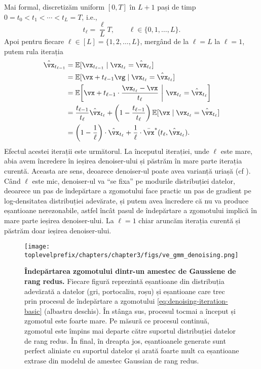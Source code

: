 \documentclass[../../book-main_ro.tex]{subfiles}
\begin{document}
Mai formal, discretizăm uniform \([0, T]\) în \(L + 1\) pași de timp \(0 = t_{0} < t_{1} < \cdots < t_{L} = T\), i.e.,
\begin{equation}
	t_{\ell} = \frac{\ell}{L}T, \qquad \ell \in \{0, 1, \dots, L\}.
\end{equation}
Apoi pentru fiecare \(\ell \in [L] = \{1, 2, \dots, L\}\), mergând de la \(\ell = L\) la \(\ell = 1\), putem rula iterația
\begin{align}
	\hat{\vx}_{t_{\ell - 1}}
	&= \Ex[\vx_{t_{\ell - 1}} \mid \vx_{t_{\ell}} = \hat{\vx}_{t_{\ell}}] \\
	&= \Ex[\vx + t_{\ell - 1}\vg \mid \vx_{t_{\ell}} = \hat{\vx}_{t_{\ell}}] \\
	&= \Ex\rs{\vx + t_{\ell - 1}\cdot\frac{\vx_{t_{\ell}} - \vx}{t_{\ell}} \given \vx_{t_{\ell}} = \hat{\vx}_{t_{\ell}}} \\
	&= \frac{t_{\ell - 1}}{t_{\ell}}\hat{\vx}_{t_{\ell}} + \bp{1 - \frac{t_{\ell - 1}}{t_{\ell}}}\Ex[\vx \mid \vx_{t_{\ell}} = \hat{\vx}_{t_{\ell}}] \\
	&= \bp{1 - \frac{1}{\ell}}\cdot\hat{\vx}_{t_{\ell}} + \frac{1}{\ell}\cdot\bar{\vx}^{\ast}(t_{\ell}, \hat{\vx}_{t_{\ell}}).
\end{align}
Efectul acestei iterații este următorul. La începutul iterației, unde \(\ell\) este mare, abia avem încredere în ieșirea denoiser-ului și păstrăm în mare parte iterația curentă. Aceasta are sens, deoarece denoiser-ul poate avea varianță uriașă (cf ). Când \(\ell\) este mic, denoiser-ul va ``se fixa'' pe modurile distribuției datelor, deoarece un pas de îndepărtare a zgomotului face practic un pas de gradient pe log-densitatea distribuției adevărate, și putem avea încredere că nu va produce eșantioane nerezonabile, astfel încât pasul de îndepărtare a zgomotului implică în mare parte ieșirea denoiser-ului. La \(\ell = 1\) chiar aruncăm iterația curentă și păstrăm doar ieșirea denoiser-ului.

\begin{figure}[t]
	\centering
	\texttt{[image: \\toplevelprefix/chapters/chapter3/figs/ve\_gmm\_denoising.png]}
	\caption{\small\textbf{Îndepărtarea zgomotului dintr-un amestec de Gaussiene de rang redus.} Fiecare figură reprezintă eșantioane din distribuția adevărată a datelor (gri, portocaliu, roșu) și eșantioane care trec prin procesul de îndepărtare a zgomotului \eqref{eq:denoising-iteration-basic} (albastru deschis). În stânga sus, procesul tocmai a început și zgomotul este foarte mare. Pe măsură ce procesul continuă, zgomotul este împins mai departe către suportul distribuției datelor de rang redus. În final, în dreapta jos, eșantioanele generate sunt perfect aliniate cu suportul datelor și arată foarte mult ca eșantioane extrase din modelul de amestec Gaussian de rang redus.}
	\label{fig:ve_gmm_denoising}
\end{figure}
\end{document}
